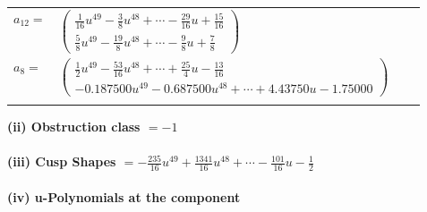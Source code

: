 \documentclass[1p]{elsarticle_modified}
\theoremstyle{definition}
\begin{document}
\begin{tabular}{m{7pt} m{180pt} m{7pt} m{180pt} }
\flushright $a_{12}=$&$\begin{pmatrix}\frac{1}{16} u^{49}-\frac{3}{8} u^{48}+\cdots-\frac{29}{16} u+\frac{15}{16}\\\frac{5}{8} u^{49}-\frac{19}{8} u^{48}+\cdots-\frac{9}{8} u+\frac{7}{8}\end{pmatrix}$ \\
\flushright $a_{8}=$&$\begin{pmatrix}\frac{1}{2} u^{49}-\frac{53}{16} u^{48}+\cdots+\frac{25}{4} u-\frac{13}{16}\\-0.187500 u^{49}-0.687500 u^{48}+\cdots+4.43750 u-1.75000\end{pmatrix}$\\&\end{tabular}
\flushleft \textbf{(ii) Obstruction class $= -1$}\\~\\
\flushleft \textbf{(iii) Cusp Shapes $= -\frac{235}{16} u^{49}+\frac{1341}{16} u^{48}+\cdots-\frac{101}{16} u-\frac{1}{2}$}\\~\\
\newpage\renewcommand{\arraystretch}{1}
\flushleft \textbf{(iv) u-Polynomials at the component}\newline \\
\end{document}

